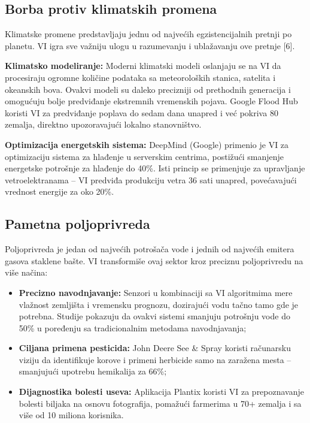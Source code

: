 \documentclass[12pt,a4paper]{article}
\begin{document}
\subsection{Borba protiv klimatskih promena}
Klimatske promene predstavljaju jednu od najvećih egzistencijalnih pretnji po planetu. VI igra sve važniju ulogu u razumevanju i ublažavanju ove pretnje [6].

\textbf{Klimatsko modeliranje:} Moderni klimatski modeli oslanjaju se na VI da procesiraju ogromne količine podataka sa meteoroloških stanica, satelita i okeanskih bova. Ovakvi modeli su daleko precizniji od prethodnih generacija i omogućuju bolje predviđanje ekstremnih vremenskih pojava. Google Flood Hub koristi VI za predviđanje poplava do sedam dana unapred i već pokriva 80 zemalja, direktno upozoravajući lokalno stanovništvo.

\textbf{Optimizacija energetskih sistema:} DeepMind (Google) primenio je VI za optimizaciju sistema za hlađenje u serverskim centrima, postižući smanjenje energetske potrošnje za hlađenje do 40\%. Isti princip se primenjuje za upravljanje vetroelektranama -- VI predviđa produkciju vetra 36 sati unapred, povećavajući vrednost energije za oko 20\%.

\subsection{Pametna poljoprivreda}
Poljoprivreda je jedan od najvećih potrošača vode i jednih od najvećih emitera gasova staklene bašte. VI transformiše ovaj sektor kroz preciznu poljoprivredu na više načina:
\begin{itemize}
    \item \textbf{Precizno navodnjavanje:} Senzori u kombinaciji sa VI algoritmima mere vlažnost zemljišta i vremensku prognozu, dozirajući vodu tačno tamo gde je potrebna. Studije pokazuju da ovakvi sistemi smanjuju potrošnju vode do 50\% u poređenju sa tradicionalnim metodama navodnjavanja;
    \item \textbf{Ciljana primena pesticida:} John Deere See \& Spray koristi računarsku viziju da identifikuje korove i primeni herbicide samo na zaražena mesta -- smanjujući upotrebu hemikalija za 66\%;
    \item \textbf{Dijagnostika bolesti useva:} Aplikacija Plantix koristi VI za prepoznavanje bolesti biljaka na osnovu fotografija, pomažući farmerima u 70+ zemalja i sa više od 10 miliona korisnika.
\end{itemize}
\end{document}

